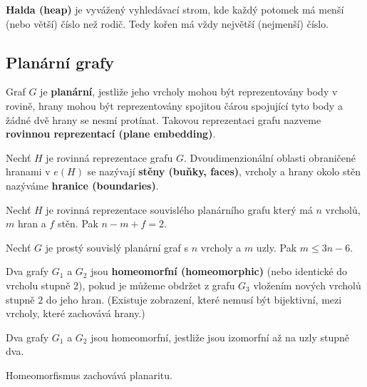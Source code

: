 \begin{definition}
\textbf{Halda (heap)} je vyvážený vyhledávací strom, kde každý potomek má menší (nebo větší) číslo než rodič. Tedy kořen má vždy největší (nejmenší) číslo.
\end{definition}

\subsection{Planární grafy}

\begin{definition}
Graf $G$ je \textbf{planární}, jestliže jeho vrcholy mohou být reprezentovány body v rovině, hrany mohou být reprezentovány spojitou čárou spojující tyto body a žádné dvě hrany se nesmí protínat. Takovou reprezentaci grafu nazveme \textbf{rovinnou reprezentací (plane embedding)}.
\end{definition}

\begin{definition}
Nechť $H$ je rovinná reprezentace grafu $G$. Dvoudimenzionální oblasti obraničené hranami v $e(H)$ se nazývají \textbf{stěny (buňky, faces)}, vrcholy a hrany okolo stěn nazýváme \textbf{hranice (boundaries)}.
\end{definition}


\begin{theorem}[Euler]
Nechť $H$ je rovinná reprezentace souvislého planárního grafu který má $n$ vrcholů, $m$ hran a $f$ stěn. Pak $n - m + f = 2$.
\end{theorem}

\begin{theorem}
Nechť $G$ je prostý souvislý planární graf s $n$ vrcholy a $m$ uzly. Pak $m \leq 3n - 6$.
\end{theorem}

\begin{definition}
Dva grafy $G_1$ a $G_2$ jsou \textbf{homeomorfní (homeomorphic)} (nebo identické do vrcholu stupně 2), pokud je můžeme obdržet z grafu $G_3$ vložením nových vrcholů stupně $2$ do jeho hran. (Existuje zobrazení, které nemusí být bijektivní, mezi vrcholy, které zachovává hrany.)
\end{definition}

\begin{theorem}
Dva grafy $G_1$ a $G_2$ jsou homeomorfní, jestliže jsou izomorfní až na uzly stupně dva.
\end{theorem}

\begin{theorem}
Homeomorfismus zachovává planaritu.
\end{theorem}

